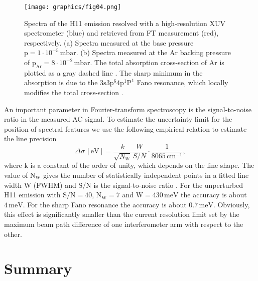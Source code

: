 \documentclass[fleqn,10pt]{wlscirep}
\begin{document}
\begin{figure}[t!]
\centering
\texttt{[image: graphics/fig04.png]}
\caption{Spectra of the H11 emission resolved with a high-resolution XUV spectrometer (blue) and retrieved from FT measurement (red), respectively. (a) Spectra measured at the base pressure $\mathrm{p=1\cdot 10^{-5}\,mbar}$. (b) Spectra measured at the Ar backing pressure of $\mathrm{p_{Ar}=8\cdot 10^{-2}\,mbar}$. The total absorption cross-section of Ar is plotted as a gray dashed line \cite{Madden1969}. The sharp minimum in the absorption is due to the $\mathrm{3s3p^{6}4p^{1}P^{1}}$ Fano resonance, which locally modifies the total cross-section \cite{Sorensen1994}.}
\label{fig:XUVEFTcomparison}
\end{figure}

An important parameter in Fourier-transform spectroscopy is the signal-to-noise ratio in the measured AC signal. To estimate the uncertainty limit for the position of spectral features we use the following empirical relation to estimate the line precision 
\begin{equation}
    \Delta \sigma\,[\mathrm{eV}]= \frac{k}{\sqrt{N_{W}}}\frac{W}{S/N}\cdot\frac{1}{\mathrm{8065\,cm^{-1}}},
\end{equation}
where $\mathrm{k}$ is a constant of the order of unity, which depends on the line shape. The value of $\mathrm{N_{W}}$ gives the number of statistically independent points in a fitted line width $\mathrm{W}$ (FWHM) and $\mathrm{S/N}$ is the signal-to-noise ratio \cite{Brault1987}. For the unperturbed H11 emission with $\mathrm{S/N=40}$, $\mathrm{N_{W}=7}$ and $\mathrm{W=430\,meV}$ the accuracy is about $\mathrm{4\,meV}$. For the sharp Fano resonance the accuracy is about $\mathrm{0.7\,meV}$. Obviously, this effect is significantly smaller than the current resolution limit set by the maximum beam path difference of one interferometer arm with respect to the other. 

\section{Summary}
\end{document}
